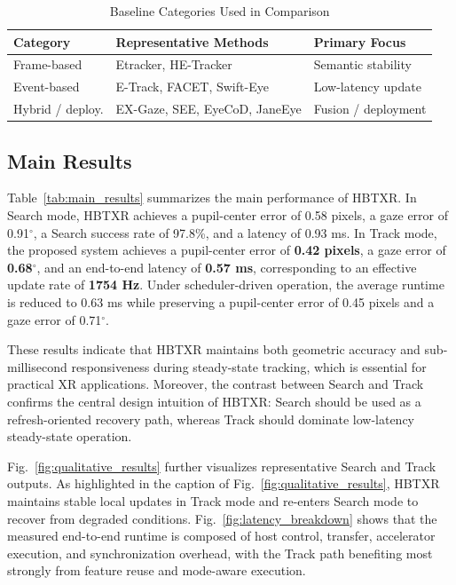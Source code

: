 ﻿\documentclass[journal]{IEEEtran}
\begin{document}
\begin{table}[!t]
\caption{Baseline Categories Used in Comparison}
\label{tab:baseline_summary}
\centering
\footnotesize
\begin{tabular}{lll}
\toprule
Category & Representative Methods & Primary Focus \\
\midrule
Frame-based & Etracker, HE-Tracker & Semantic stability \\
Event-based & E-Track, FACET, Swift-Eye & Low-latency update \\
Hybrid / deploy. & EX-Gaze, SEE, EyeCoD, JaneEye & Fusion / deployment \\
\bottomrule
\end{tabular}
\end{table}

\subsection{Main Results}

Table~\ref{tab:main_results} summarizes the main performance of HBTXR. In Search mode, HBTXR achieves a pupil-center error of 0.58 pixels, a gaze error of 0.91$^\circ$, a Search success rate of 97.8\%, and a latency of 0.93 ms. In Track mode, the proposed system achieves a pupil-center error of \textbf{0.42 pixels}, a gaze error of \textbf{0.68$^\circ$}, and an end-to-end latency of \textbf{0.57 ms}, corresponding to an effective update rate of \textbf{1754 Hz}. Under scheduler-driven operation, the average runtime is reduced to 0.63 ms while preserving a pupil-center error of 0.45 pixels and a gaze error of 0.71$^\circ$.

These results indicate that HBTXR maintains both geometric accuracy and sub-millisecond responsiveness during steady-state tracking, which is essential for practical XR applications. Moreover, the contrast between Search and Track confirms the central design intuition of HBTXR: Search should be used as a refresh-oriented recovery path, whereas Track should dominate low-latency steady-state operation.

Fig.~\ref{fig:qualitative_results} further visualizes representative Search and Track outputs. As highlighted in the caption of Fig.~\ref{fig:qualitative_results}, HBTXR maintains stable local updates in Track mode and re-enters Search mode to recover from degraded conditions. Fig.~\ref{fig:latency_breakdown} shows that the measured end-to-end runtime is composed of host control, transfer, accelerator execution, and synchronization overhead, with the Track path benefiting most strongly from feature reuse and mode-aware execution.
\end{document}
